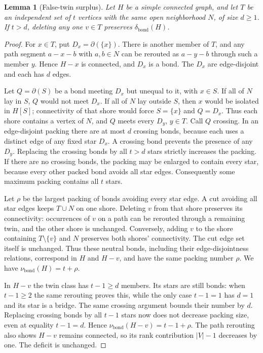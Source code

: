 \documentclass[11pt]{article}
\newtheorem{lemma}[theorem]{Lemma}
\newcommand{\bond}{\operatorname{bond}}
\begin{document}
\begin{lemma}[False-twin surplus]\label{lem:twins}
Let $H$ be a simple connected graph, and let $T$ be an independent
set of $t$ vertices with the same open neighborhood $N$, of size
$d\geq1$.  If $t>d$, deleting any one $v\in T$ preserves
$\delta_{\bond}(H)$.
\end{lemma}
\begin{proof}
For $x\in T$, put $D_x=\partial(\{x\})$.  There is another member
of $T$, and any path segment $a-x-b$ with $a,b\in N$ can be rerouted
as $a-y-b$ through such a member $y$.  Hence $H-x$ is connected,
and $D_x$ is a bond.  The $D_x$ are edge-disjoint and each has $d$
edges.

Let $Q=\partial(S)$ be a bond meeting $D_x$ but unequal to it, with
$x\in S$.  If all of $N$ lay in $S$, $Q$ would not meet $D_x$.  If
all of $N$ lay outside $S$, then $x$ would be isolated in $H[S]$;
connectivity of that shore would force $S=\{x\}$ and $Q=D_x$.
Thus each shore contains a vertex of $N$, and $Q$ meets every
$D_y$, $y\in T$.  Call $Q$ crossing.  In an edge-disjoint packing
there are at most $d$ crossing bonds, because each uses a distinct
edge of any fixed star $D_x$.  A crossing bond prevents the presence
of any $D_y$.  Replacing the crossing bonds by all $t>d$ stars
strictly increases the packing.  If there are no crossing bonds,
the packing may be enlarged to contain every star, because every
other packed bond avoids all star edges.  Consequently some maximum
packing contains all $t$ stars.

Let $\rho$ be the largest packing of bonds avoiding every star edge.
A cut avoiding all star edges keeps $T\cup N$ on one shore.  Deleting
$v$ from that shore preserves its connectivity: occurrences of $v$
on a path can be rerouted through a remaining twin, and the other
shore is unchanged.  Conversely, adding $v$ to the shore containing
$T\setminus\{v\}$ and $N$ preserves both shores' connectivity.
The cut edge set itself is unchanged.  Thus these neutral bonds,
including their edge-disjointness relations, correspond in $H$ and
$H-v$, and have the same packing number $\rho$.  We have
$\nu_{\bond}(H)=t+\rho$.

In $H-v$ the twin class has $t-1\geq d$ members.  Its stars are
still bonds: when $t-1\geq2$ the same rerouting proves this, while
the only case $t-1=1$ has $d=1$ and its star is a bridge.  The same
crossing argument bounds their number by $d$.
Replacing crossing bonds by all $t-1$ stars now does not decrease
packing size, even at equality $t-1=d$.  Hence
$\nu_{\bond}(H-v)=t-1+\rho$.  The path rerouting also shows $H-v$
remains connected, so its rank contribution $|V|-1$ decreases by
one.  The deficit is unchanged.
\end{proof}
\end{document}
